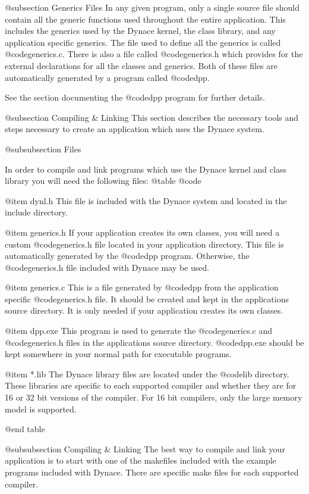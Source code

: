 @subsection Generics Files
In any given program, only a single source file should contain all the
generic functions used throughout the entire application.  This includes
the generics used by the Dynace kernel, the class library, and any
application specific generics.  The file used to define all the generics
is called @code{generics.c}.  There is also a file called @code{generics.h}
which provides for the external declarations for all the classes and
generics.  Both of these files are automatically generated by a program
called @code{dpp}.

See the section documenting the @code{dpp} program for further
details.


@subsection Compiling & Linking
This section describes the necessary tools and steps necessary to create
an application which uses the Dynace system.

@subsubsection Files

In order to compile and link programs which use the Dynace kernel and class
library you will need the following files:
@table @code

@item dynl.h
This file is included with the Dynace system and located in the
include directory.

@item generics.h
If your application creates its own classes, you will need a custom
@code{generics.h} file located in your application directory.
This file is automatically generated by the @code{dpp} program.
Otherwise, the @code{generics.h} file included with Dynace may
be used.

@item generics.c
This is a file generated by @code{dpp} from the application specific
@code{generics.h} file.  It should be created and kept in the
applications source directory.  It is only needed if your application
creates its own classes.

@item dpp.exe
This program is used to generate the @code{generics.c} and
@code{generics.h} files in the applications source directory.
@code{dpp.exe} should be kept somewhere in your normal path for
executable programs.

@item *.lib
The Dynace library files are located under the @code{lib} directory.
These libraries are specific to each supported compiler and whether
they are for 16 or 32 bit versions of the compiler.  For 16 bit
compilers, only the large memory model is supported.

@end table

@subsubsection Compiling & Linking
The best way to compile and link your application is to start with one
of the makefiles included with the example programs included with Dynace.
There are specific make files for each supported compiler.

